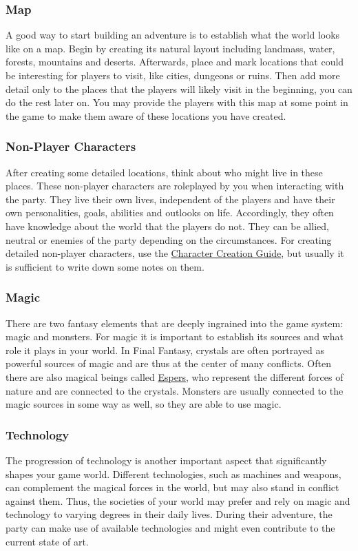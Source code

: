 \subsubsection*{Map}
A good way to start building an adventure is to establish what the world looks like on a map. 
Begin by creating its natural layout including landmass, water, forests, mountains and deserts. 
Afterwards, place and mark locations that could be interesting for players to visit, like cities, dungeons or ruins.
Then add more detail only to the places that the players will likely visit in the beginning, you can do the rest later on.
You may provide the players with this map at some point in the game to make them aware of these locations you have created.

\pagebreak

\subsubsection*{Non-Player Characters}
After creating some detailed locations, think about who might live in these places.
These non-player characters are roleplayed by you when interacting with the party.
They live their own lives, independent of the players and have their own personalities, goals, abilities and outlooks on life. 
Accordingly, they often have knowledge about the world that the players do not.
They can be allied, neutral or enemies of the party depending on the circumstances.
For creating detailed non-player characters, use the \hyperlink{char}{Character Creation Guide}, but usually it is sufficient to write down some notes on them.

\subsubsection*{Magic}
There are two fantasy elements that are deeply ingrained into the game system: magic and monsters.
For magic it is important to establish its sources and what role it plays in your world.
In Final Fantasy, crystals are often portrayed as powerful sources of magic and are thus at the center of many conflicts.
Often there are also magical beings called \hyperlink{summons}{Espers}, who represent the different forces of nature and are connected to the crystals.
Monsters are usually connected to the magic sources in some way as well, so they are able to use magic. 

\subsubsection*{Technology}
The progression of technology is another important aspect that significantly shapes your game world.
Different technologies, such as machines and weapons, can complement the magical forces in the world, but may also stand in conflict against them.
Thus, the societies of your world may prefer and rely on magic and technology to varying degrees in their daily lives.
During their adventure, the party can make use of available technologies and might even contribute to the current state of art.

